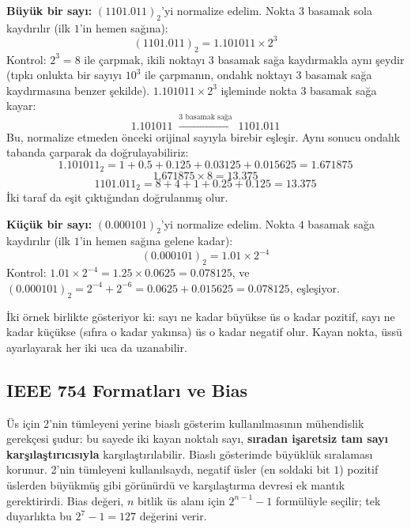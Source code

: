 \begin{ornek}
\textbf{Büyük bir sayı:} $(1101.011)_2$'yi normalize edelim. Nokta $3$ basamak sola kaydırılır
(ilk $1$'in hemen sağına):
\[
(1101.011)_2 = 1.101011 \times 2^{3}
\]
Kontrol: $2^3=8$ ile çarpmak, ikili noktayı $3$ basamak sağa kaydırmakla aynı şeydir
(tıpkı onlukta bir sayıyı $10^3$ ile çarpmanın, ondalık noktayı $3$ basamak sağa
kaydırmasına benzer şekilde). $1.101011\times2^3$ işleminde nokta $3$ basamak sağa
kayar:
\[
1.101011 \;\xrightarrow{3\text{ basamak sağa}}\; 1101.011
\]
Bu, normalize etmeden önceki orijinal sayıyla birebir eşleşir. Aynı sonucu ondalık
tabanda çarparak da doğrulayabiliriz:
\[
1.101011_2=1+0.5+0.125+0.03125+0.015625=1.671875
\]
\[
1.671875\times8=13.375
\]
\[
1101.011_2=8+4+1+0.25+0.125=13.375
\]
İki taraf da eşit çıktığından doğrulanmış olur. \checkmark

\textbf{Küçük bir sayı:} $(0.000101)_2$'yi normalize edelim. Nokta $4$ basamak sağa
kaydırılır (ilk $1$'in hemen sağına gelene kadar):
\[
(0.000101)_2 = 1.01 \times 2^{-4}
\]
Kontrol: $1.01\times2^{-4}=1.25\times0.0625=0.078125$, ve $(0.000101)_2=2^{-4}+2^{-6}=
0.0625+0.015625=0.078125$, eşleşiyor.

İki örnek birlikte gösteriyor ki: sayı ne kadar büyükse üs o kadar pozitif, sayı ne kadar
küçükse (sıfıra o kadar yakınsa) üs o kadar negatif olur. Kayan nokta, üssü ayarlayarak
her iki uca da uzanabilir.
\end{ornek}

\subsection{IEEE 754 Formatları ve Bias}
\label{sec:ieee754-format}

\begin{bilginot}
Üs için 2'nin tümleyeni yerine biaslı gösterim kullanılmasının mühendislik gerekçesi
şudur: bu sayede iki kayan noktalı sayı, \textbf{sıradan işaretsiz tam sayı
karşılaştırıcısıyla} karşılaştırılabilir. Biaslı gösterimde büyüklük sıralaması korunur.
2'nin tümleyeni kullanılsaydı, negatif üsler (en soldaki bit $1$) pozitif üslerden büyükmüş
gibi görünürdü ve karşılaştırma devresi ek mantık gerektirirdi. Bias değeri, $n$ bitlik üs
alanı için $2^{n-1}-1$ formülüyle seçilir; tek duyarlıkta bu $2^7-1=127$ değerini verir.
\end{bilginot}

